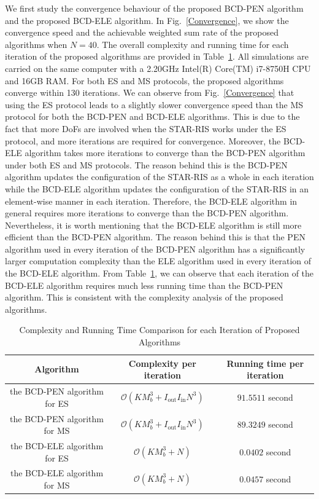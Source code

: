 \documentclass[12pt, draftclsnofoot, onecolumn]{IEEEtran}
\begin{document}
We ﬁrst study the convergence behaviour of the proposed BCD-PEN algorithm and the proposed BCD-ELE algorithm. In Fig.~\ref{Convergence}, we show the convergence speed and the achievable weighted sum rate of the proposed algorithms when $N=40$. The overall complexity and running time for each iteration of the proposed algorithms are provided in Table~\ref{Complexity_and_Running_Time}. All simulations are carried on the same computer with a 2.20GHz Intel(R) Core(TM) i7-8750H CPU and 16GB RAM. For both ES and MS protocols, the proposed algorithms converge within 130 iterations. We can observe from Fig.~\ref{Convergence} that using the ES protocol leads to a slightly slower convergence speed than the MS protocol for both the BCD-PEN and BCD-ELE algorithms. This is due to the fact that more DoFs are involved when the STAR-RIS works under the ES protocol, and more iterations are required for convergence. Moreover, the BCD-ELE algorithm takes more iterations to converge than the BCD-PEN algorithm under both ES and MS protocols. The reason behind this is the BCD-PEN algorithm updates the configuration of the STAR-RIS as a whole in each iteration while the BCD-ELE algorithm updates the configuration of the STAR-RIS in an element-wise manner in each iteration. Therefore, the BCD-ELE algorithm in general requires more iterations to converge than the BCD-PEN algorithm. Nevertheless, it is worth mentioning that the BCD-ELE algorithm is still more efficient than the BCD-PEN algorithm. The reason behind this is that the PEN algorithm used in every iteration of the BCD-PEN algorithm has a significantly larger computation complexity than the ELE algorithm used in every iteration of the BCD-ELE algorithm. From Table~\ref{Complexity_and_Running_Time}, we can observe that each iteration of the BCD-ELE algorithm requires much less running time than the BCD-PEN algorithm. This is consistent with the complexity analysis of the proposed algorithms.
\begingroup
\renewcommand{\arraystretch}{1} %
\begin{table}[h]
\centering
\begin{footnotesize}
\caption{Complexity and Running Time Comparison for each Iteration of Proposed Algorithms}
\label{Complexity_and_Running_Time}
\centering
\begin{tabular}{|c|c|c|}
\hline
Algorithm & Complexity per iteration& Running time per iteration \\
\hline
the BCD-PEN algorithm for ES &  $\mathcal{O}\left(K M_b^3 + {I}_\text{out} {I}_\text{in}  N^3\right)$ & $91.5511$ second \\
\hline
the BCD-PEN algorithm for MS &  $\mathcal{O}\left(K M_b^3 + {I}_\text{out} {I}_\text{in}  N^3\right)$ & $89.3249$ second \\
\hline
the BCD-ELE algorithm for ES & $\mathcal{O}\left(K M_b^3 + N\right)$ & $0.0402$ second \\
\hline
the BCD-ELE algorithm for MS & $\mathcal{O}\left(K M_b^3 + N\right)$  &  $0.0457$ second \\
\hline
\end{tabular}
\end{footnotesize}
\end{table}
\end{document}
